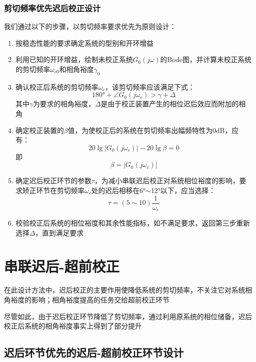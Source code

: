 \subsubsection{剪切频率优先迟后校正设计}
我们通过以下的步骤，以剪切频率要求优先为原则设计：
\begin{enumerate}
    \item 按稳态性能的要求确定系统的型别和开环增益
    \item 利用已知的开环增益，绘制未校正系统$G_0(j\omega)$的Bode图，并计算未校正系统的剪切频率$\omega_{c0}$和相角裕度$\gamma_0$
    \item 确认校正后系统的剪切频率$\omega_c$，该剪切频率应该满足下式：
    \begin{equation*}
        180\text{°}+ \angle G_0(j\omega_c) > \gamma + \Delta
    \end{equation*}
    其中$\gamma$为要求的相角裕度，$\Delta$是由于校正装置产生的相位迟后效应而附加的相角
    \item 确定校正装置的$\beta$值，为使校正后的系统在剪切频率出幅频特性为0dB，应有：
    \begin{equation*}
        20 \lg \left\lvert G_0(j\omega_c) \right\rvert - 20\lg \beta = 0 
    \end{equation*}
    即
    \begin{equation*}
        \beta = \left\lvert G_0(j\omega_c) \right\rvert 
    \end{equation*}
    \item 确定迟后校正环节的参数$\tau$，为减小串联迟后校正对系统相位裕度的影响，要求矫正环节在剪切频率$\omega_c$处的迟后相移在6°$\sim$12°以下，应当选择：
    \begin{equation*}
        \tau = (5 \sim 10) \frac{1}{\omega_c}
    \end{equation*}
    \item 校验校正后系统的相位裕度和其余性能指标，如不满足要求，返回第三步重新选择$\Delta$，直到满足要求
\end{enumerate}

\section{串联迟后-超前校正}
在此设计方法中，迟后校正的主要作用使降低系统的剪切频率，不关注它对系统相角裕度的影响；相角裕度提高的任务交给超前校正环节

尽管如此，由于迟后校正环节降低了剪切频率，通过利用原系统的相位储备，迟后校正后系统的相角裕度事实上得到了部分提升

\subsection{迟后环节优先的迟后-超前校正环节设计}

